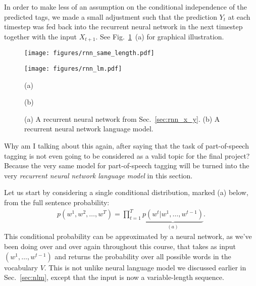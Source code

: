 \documentclass{report}
\begin{document}
In order to make less of an assumption on the conditional independence of the
predicted tags, we made a small adjustment such that the prediction $Y_{t}$ at
each timestep was fed back into the recurrent neural network in the next
timestep together with the input $X_{t+1}$. See Fig.~\ref{fig:rnn_lm}~(a) for
graphical illustration.

\begin{figure}[t]
    \centering
    \begin{minipage}{0.44\textwidth}
        \centering
        \texttt{[image: figures/rnn\_same\_length.pdf]}
    \end{minipage}
    \hfill
    \begin{minipage}{0.55\textwidth}
        \centering
        \texttt{[image: figures/rnn\_lm.pdf]}
    \end{minipage}

    \begin{minipage}{0.44\textwidth}
        \centering
        (a)
    \end{minipage}
    \hfill
    \begin{minipage}{0.55\textwidth}
        \centering
        (b)
    \end{minipage}

    \caption{
        (a) A recurrent neural network from Sec.~\ref{sec:rnn_x_y}. (b) A
        recurrent neural network language model.
    }
    \label{fig:rnn_lm}
\end{figure}

Why am I talking about this again, after saying that the task of part-of-speech
tagging is not even going to be considered as a valid topic for the final
project? Because the very same model for part-of-speech tagging will be turned
into the very {\em recurrent neural network language model} in this section.

Let us start by considering a single conditional distribution, marked (a) below,
from the full sentence probability:
\begin{align*}
    p(w^1, w^2, \ldots, w^T) = \prod_{t=1}^T \underbrace{p(w^t|w^1, \ldots,
    w^{t-1})}_{(a)}.
\end{align*}
This conditional probability can be approximated by a neural network, as we've
been doing over and over again throughout this course, that takes as input
$(w^1, \ldots, w^{t-1})$ and returns the probability over all possible words in
the vocabulary $V$.  This is not unlike neural language model we discussed
earlier in Sec.~\ref{sec:nlm}, except that the input is now a variable-length
sequence.
\end{document}
